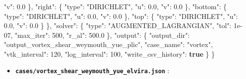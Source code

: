 \documentclass[
  10pt,
]{article}
\newenvironment{Shaded}{}{}
\newcommand{\DataTypeTok}[1]{\textcolor[rgb]{0.56,0.13,0.00}{#1}}
\newcommand{\DecValTok}[1]{\textcolor[rgb]{0.25,0.63,0.44}{#1}}
\newcommand{\FloatTok}[1]{\textcolor[rgb]{0.25,0.63,0.44}{#1}}
\newcommand{\FunctionTok}[1]{\textcolor[rgb]{0.02,0.16,0.49}{#1}}
\newcommand{\KeywordTok}[1]{\textcolor[rgb]{0.00,0.44,0.13}{\textbf{#1}}}
\newcommand{\StringTok}[1]{\textcolor[rgb]{0.25,0.44,0.63}{#1}}
\providecommand{\tightlist}{%
  \setlength{\itemsep}{0pt}\setlength{\parskip}{0pt}}
\begin{document}
\begin{Shaded}
\begin{Highlighting}[]
      \DataTypeTok{"v"}\FunctionTok{:} \FloatTok{0.0}
    \FunctionTok{\},}
    \DataTypeTok{"right"}\FunctionTok{:} \FunctionTok{\{}
      \DataTypeTok{"type"}\FunctionTok{:} \StringTok{"DIRICHLET"}\FunctionTok{,}
      \DataTypeTok{"u"}\FunctionTok{:} \FloatTok{0.0}\FunctionTok{,}
      \DataTypeTok{"v"}\FunctionTok{:} \FloatTok{0.0}
    \FunctionTok{\},}
    \DataTypeTok{"bottom"}\FunctionTok{:} \FunctionTok{\{}
      \DataTypeTok{"type"}\FunctionTok{:} \StringTok{"DIRICHLET"}\FunctionTok{,}
      \DataTypeTok{"u"}\FunctionTok{:} \FloatTok{0.0}\FunctionTok{,}
      \DataTypeTok{"v"}\FunctionTok{:} \FloatTok{0.0}
    \FunctionTok{\},}
    \DataTypeTok{"top"}\FunctionTok{:} \FunctionTok{\{}
      \DataTypeTok{"type"}\FunctionTok{:} \StringTok{"DIRICHLET"}\FunctionTok{,}
      \DataTypeTok{"u"}\FunctionTok{:} \FloatTok{0.0}\FunctionTok{,}
      \DataTypeTok{"v"}\FunctionTok{:} \FloatTok{0.0}
    \FunctionTok{\}}
  \FunctionTok{\},}
  \DataTypeTok{"solver"}\FunctionTok{:} \FunctionTok{\{}
    \DataTypeTok{"type"}\FunctionTok{:} \StringTok{"AUGMENTED\_LAGRANGIAN"}\FunctionTok{,}
    \DataTypeTok{"tol"}\FunctionTok{:} \DecValTok{1e{-}07}\FunctionTok{,}
    \DataTypeTok{"max\_iter"}\FunctionTok{:} \DecValTok{500}\FunctionTok{,}
    \DataTypeTok{"r\_al"}\FunctionTok{:} \FloatTok{500.0}
  \FunctionTok{\},}
  \DataTypeTok{"output"}\FunctionTok{:} \FunctionTok{\{}
    \DataTypeTok{"output\_dir"}\FunctionTok{:} \StringTok{"output\_vortex\_shear\_weymouth\_yue\_plic"}\FunctionTok{,}
    \DataTypeTok{"case\_name"}\FunctionTok{:} \StringTok{"vortex"}\FunctionTok{,}
    \DataTypeTok{"vtk\_interval"}\FunctionTok{:} \DecValTok{120}\FunctionTok{,}
    \DataTypeTok{"log\_interval"}\FunctionTok{:} \DecValTok{100}\FunctionTok{,}
    \DataTypeTok{"write\_csv\_history"}\FunctionTok{:} \KeywordTok{true}
  \FunctionTok{\}}
\FunctionTok{\}}
\end{Highlighting}
\end{Shaded}

\begin{itemize}
\tightlist
\item
  \textbf{\texttt{cases/vortex\_shear\_weymouth\_yue\_elvira.json}} :
\end{itemize}
\end{document}
